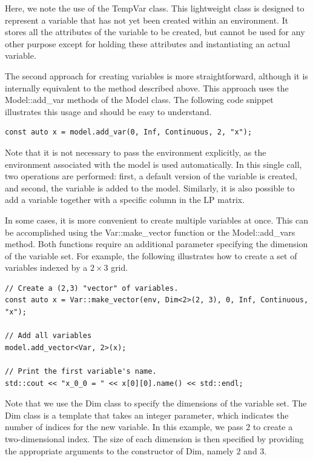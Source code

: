 Here, we note the use of the \textsf{TempVar} class. This lightweight class is
designed to represent a variable that has not yet been created within an
environment. It stores all the attributes of the variable to be created, but
cannot be used for any other purpose except for holding these attributes and
instantiating an actual variable.

The second approach for creating variables is more straightforward, although
it is internally equivalent to the method described above. This approach uses
the \textsf{Model::add\_var} methods of the \textsf{Model} class. The
following code snippet illustrates this usage and should be easy to
understand.
%
\begin{lstlisting}
const auto x = model.add_var(0, Inf, Continuous, 2, "x");
\end{lstlisting}
%
Note that it is not necessary to pass the environment explicitly, as the
environment associated with the model is used automatically. In this single
call, two operations are performed: first, a default version of the variable
is created, and second, the variable is added to the model. Similarly, it is
also possible to add a variable together with a specific column in the LP
matrix.

In some cases, it is more convenient to create multiple variables at once.
This can be accomplished using the \textsf{Var::make\_vector} function or the
\textsf{Model::add\_vars} method. Both functions require an additional
parameter specifying the dimension of the variable set. For example, the
following illustrates how to create a set of variables indexed by a $2\times
3$ grid.
%
\begin{lstlisting}
// Create a (2,3) "vector" of variables.
const auto x = Var::make_vector(env, Dim<2>(2, 3), 0, Inf, Continuous, "x");

// Add all variables
model.add_vector<Var, 2>(x);

// Print the first variable's name.
std::cout << "x_0_0 = " << x[0][0].name() << std::endl;
\end{lstlisting}

Note that we use the \textsf{Dim} class to specify the dimensions of the
variable set. The \textsf{Dim} class is a template that takes an integer
parameter, which indicates the number of indices for the new variable. In this
example, we pass $2$ to create a two-dimensional index. The size of each
dimension is then specified by providing the appropriate arguments to the
constructor of \textsf{Dim}, namely $2$ and $3$.

